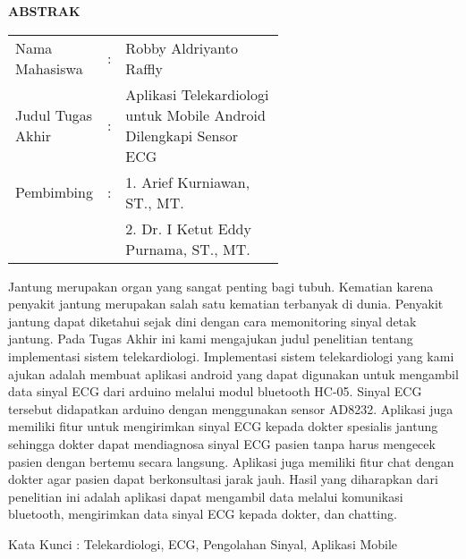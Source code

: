 \begin{center}
\Large\textbf{ABSTRAK}
\end{center}
\vspace{1ex}

\begin{adjustwidth}{-0.2cm}{}
\begin{tabular}{lcp{0.6\linewidth}}
Nama Mahasiswa &:& Robby Aldriyanto Raffly \\
Judul Tugas Akhir &:& Aplikasi Telekardiologi untuk Mobile Android Dilengkapi Sensor ECG \\
Pembimbing &:& 1. Arief Kurniawan, ST., MT. \\
& & 2. Dr. I Ketut Eddy Purnama, ST., MT.  \\
\end{tabular}
\end{adjustwidth}
\vspace{1ex}

\setlength{\parindent}{0cm} Jantung merupakan organ yang sangat penting bagi tubuh. Kematian karena penyakit jantung merupakan salah satu kematian terbanyak di dunia. Penyakit jantung dapat diketahui sejak dini dengan cara memonitoring sinyal detak jantung. Pada Tugas Akhir ini kami mengajukan judul penelitian tentang implementasi sistem telekardiologi. Implementasi sistem telekardiologi yang kami ajukan adalah membuat aplikasi android yang dapat digunakan untuk mengambil data sinyal ECG dari arduino melalui modul bluetooth HC-05. Sinyal ECG tersebut didapatkan arduino dengan menggunakan sensor AD8232. Aplikasi juga memiliki fitur untuk mengirimkan sinyal ECG kepada dokter spesialis jantung sehingga dokter dapat mendiagnosa sinyal ECG pasien tanpa harus mengecek pasien dengan bertemu secara langsung. Aplikasi juga memiliki fitur chat dengan dokter agar pasien dapat berkonsultasi jarak jauh. Hasil yang diharapkan dari penelitian ini adalah aplikasi dapat mengambil data melalui komunikasi bluetooth, mengirimkan data sinyal ECG kepada dokter, dan chatting.

\vspace{2ex}

Kata Kunci : Telekardiologi, ECG, Pengolahan Sinyal, Aplikasi Mobile
\newpage